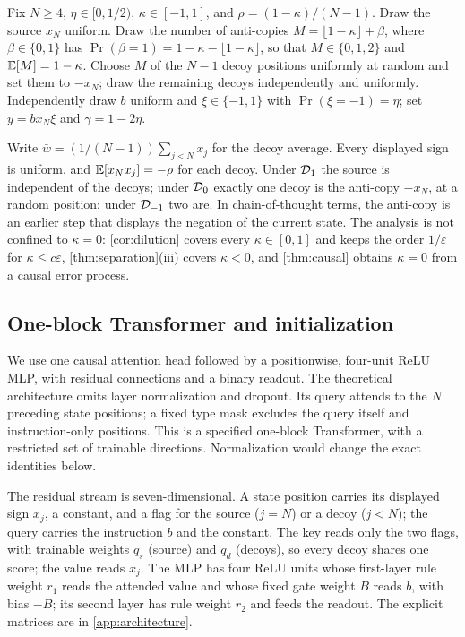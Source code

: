 \begin{definition}
\label{def:Dkappa}
Fix $N\ge4$, $\eta\in[0,1/2)$, $\kappa\in[-1,1]$, and $\rho=(1-\kappa)/(N-1)$.
Draw the source $x_N$ uniform. Draw the number of anti-copies $M=\lfloor1-\kappa\rfloor+\beta$, where
$\beta\in\{0,1\}$ has $\Pr(\beta=1)=1-\kappa-\lfloor1-\kappa\rfloor$, so that $M\in\{0,1,2\}$ and $\mathbb E[M]=1-\kappa$.
Choose $M$ of the $N-1$ decoy positions uniformly at random and set them to $-x_N$; draw the remaining decoys independently and uniformly.
Independently draw $b$ uniform and $\xi\in\{-1,1\}$ with $\Pr(\xi=-1)=\eta$;
set $y=b x_N \xi$ and $\gamma=1-2\eta$.
\end{definition}
Write $\bar w=(1/(N-1))\sum_{j<N}x_j$ for the decoy average.
Every displayed sign is uniform, and $\mathbb E[x_N x_j]=-\rho$ for each decoy.
Under $\mathcal D_{1}$ the source is independent of the decoys; under $\mathcal D_{0}$ exactly one decoy is the anti-copy $-x_N$, at a random position;
under $\mathcal D_{-1}$ two are. In chain-of-thought terms, the anti-copy is an earlier step that displays the negation of the current state.
The analysis is not confined to $\kappa=0$: \cref{cor:dilution} covers every $\kappa\in[0,1]$ and keeps the order $1/\varepsilon$ for $\kappa\le c\varepsilon$,
\cref{thm:separation}(iii) covers $\kappa<0$, and \cref{thm:causal} obtains $\kappa=0$ from a causal error process.

\subsection{One-block Transformer and initialization}
\label{sec:architecture}
We use one causal attention head followed by a positionwise, four-unit ReLU MLP, with residual connections and a binary readout.
The theoretical architecture omits layer normalization and dropout. Its query attends to the $N$ preceding state positions;
a fixed type mask excludes the query itself and instruction-only positions. This is a specified one-block Transformer,
with a restricted set of trainable directions. Normalization would change the exact identities below.

The residual stream is seven-dimensional. A state position carries its displayed sign $x_j$, a constant, and a flag for the source ($j=N$)
or a decoy ($j<N$); the query carries the instruction $b$ and the constant. The key reads only the two flags, with trainable weights $q_s$ (source)
and $q_d$ (decoys), so every decoy shares one score; the value reads $x_j$. The MLP has four ReLU units whose first-layer rule weight $r_1$ reads
the attended value and whose fixed gate weight $B$ reads $b$, with bias $-B$; its second layer has rule weight $r_2$ and feeds the readout.
The explicit matrices are in \cref{app:architecture}.

